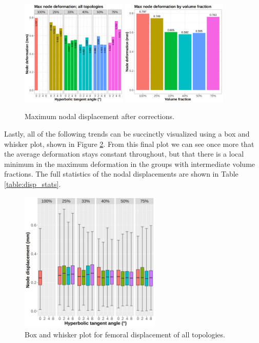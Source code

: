 \documentclass[../main.tex]{subfiles}
\begin{document}
\begin{figure}[h!]
  \includegraphics[width=0.45\textwidth]{images/results/plots/femoral/displacement/femoral_max.png}
  \hfill
  \includegraphics[width=0.45\textwidth]{images/results/plots/femoral/displacement/femoral_max_group.png}
  \caption{Maximum nodal displacement after corrections.}
  \label{fig:disp_max_correct}
\end{figure}

Lastly, all of the following trends can be succinctly visualized using a box and whisker plot, shown in Figure \ref{fig:disp_boxwhisker}. From this final plot we can see once more that the average deformation stays constant throughout, but that there is a local minimum in the maximum deformation in the groups with intermediate volume fractions. The full statistics of the nodal displacements are shown in Table \ref{table:disp_stats}.
 
\begin{figure}[h!]
  \centering
  \includegraphics[width=0.6\textwidth]{images/results/plots/femoral/displacement/boxplots.png}
  \caption{Box and whisker plot for femoral displacement of all topologies.}
  \label{fig:disp_boxwhisker}
\end{figure}
\end{document}
